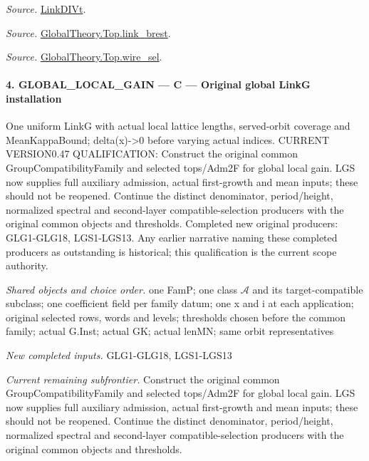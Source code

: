 \documentclass[11pt,a4paper]{article}
\numberwithin{equation}{section}
\theoremstyle{remark}\newtheorem{remark}[theorem]{Remark}
\begin{document}
\emph{Source.} \href{https://github.com/CocoSgt/riemann-hypothesis-lean/blob/7cbf7a0c32fca1badf05931879a37c3f8a2b03b4/src/Formalism/SharpRestriction/GlobalTheoremInputs.lean#L94-L96}{LinkDIVt}.

\emph{Source.} \href{https://github.com/CocoSgt/riemann-hypothesis-lean/blob/7cbf7a0c32fca1badf05931879a37c3f8a2b03b4/src/Development/AbelianVarietyTheory/Proofs/GlobalInterpolation/LinkBrest.lean#L7-L25}{GlobalTheory.Top.link\_\allowbreak brest}.

\emph{Source.} \href{https://github.com/CocoSgt/riemann-hypothesis-lean/blob/7cbf7a0c32fca1badf05931879a37c3f8a2b03b4/src/Development/AbelianVarietyTheory/Proofs/GlobalInterpolation/WireSel.lean#L11-L41}{GlobalTheory.Top.wire\_\allowbreak sel}.



\paragraph{4. GLOBAL\_\allowbreak LOCAL\_\allowbreak GAIN — C — Original global LinkG installation}

One uniform LinkG with actual local lattice lengths, served-orbit coverage and MeanKappaBound; delta(x)->0 before varying actual indices. CURRENT VERSION0.47 QUALIFICATION: Construct the original common GroupCompatibilityFamily and selected tops/Adm2F for global local gain. LGS now supplies full auxiliary admission, actual first-growth and mean inputs; these should not be reopened. Continue the distinct denominator, period/height, normalized spectral and second-layer compatible-selection producers with the original common objects and thresholds. Completed new original producers: GLG1-GLG18, LGS1-LGS13. Any earlier narrative naming these completed producers as outstanding is historical; this qualification is the current scope authority.

\emph{Shared objects and choice order.} one FamP; one class $\mathcal A$ and its target-compatible subclass; one coefficient field per family datum; one x and i at each application; original selected rows, words and levels; thresholds chosen before the common family; actual G.Inst; actual GK; actual lenMN; same orbit representatives

\emph{New completed inputs.} GLG1-GLG18, LGS1-LGS13

\emph{Current remaining subfrontier.} Construct the original common GroupCompatibilityFamily and selected tops/Adm2F for global local gain. LGS now supplies full auxiliary admission, actual first-growth and mean inputs; these should not be reopened. Continue the distinct denominator, period/height, normalized spectral and second-layer compatible-selection producers with the original common objects and thresholds.
\end{document}
